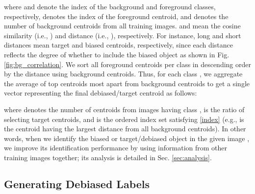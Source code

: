 \documentclass[10pt,twocolumn,letterpaper]{article}
\begin{document}
where  and  denote the index of the background and foreground classes, respectively,  denotes the index of the foreground centroid, and  denotes the number of background centroids from all  training images.  and  mean the cosine similarity (i.e., ) and distance (i.e., ), respectively. For instance, long and short distances mean target and biased centroids, respectively, since each distance reflects the degree of whether to include the biased object as shown in Fig. \ref{fig:bg_correlation}. We sort all foreground centroids per class in descending order by the distance using background centroids. Thus, for each class , we aggregate the average of top  centroids most apart from background centroids to get a single vector representing the final debiased/target centroid  as follows: 

where  denotes the number of centroids from  images having class ,  is the ratio of selecting target centroids, and  is the ordered index set satisfying \eqref{index} (e.g.,  is the centroid having the largest distance from all background centroids). In other words, when we identify the biased or target/debiased object in the given image , we improve its identification performance by using information from other training images together; its analysis is detailed in Sec. \ref{sec:analysis}.









\subsection{Generating Debiased Labels} \label{sec:generating}
\end{document}
